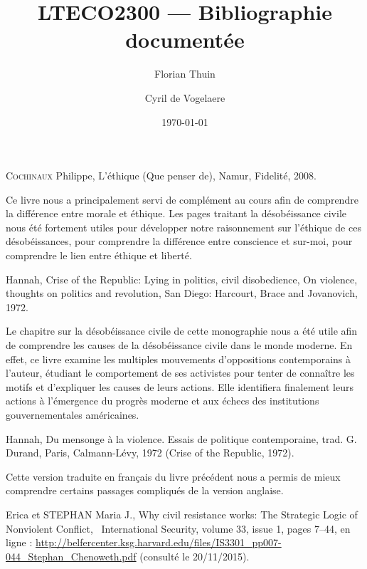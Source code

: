 \documentclass[a4paper, 11pt]{article}
\author{Florian Thuin \and Cyril de Vogelaere}
\date{\today}
\title{LTECO2300 --- Bibliographie documentée}
\begin{document}
    \maketitle
    \tableofcontents
    \textsc{Cochinaux} Philippe, L'éthique (Que penser de), Namur, Fidelité,
    2008.

    \begin{framed}
        Ce livre nous a principalement servi de complément au cours afin de
        comprendre la différence entre morale et éthique. Les pages traitant la
        désobéissance civile nous été fortement utiles pour développer notre
        raisonnement sur l’éthique de ces désobéissances, pour comprendre la
        différence entre conscience et sur-moi, pour comprendre le lien entre
        éthique et liberté.
    \end{framed}

     Hannah, Crise of the Republic: Lying in politics, civil
    disobedience, On violence, thoughts on politics and revolution, San Diego:
    Harcourt, Brace and Jovanovich, 1972.

    \begin{framed}
        Le chapitre sur la désobéissance civile de cette monographie nous a été
        utile afin de comprendre les causes de la désobéissance civile dans le
        monde moderne. En effet, ce livre examine les multiples mouvements
        d’oppositions contemporains à l’auteur, étudiant le comportement de ses
        activistes pour tenter de connaître les motifs et d’expliquer les
        causes de leurs actions. Elle identifiera finalement leurs actions à
        l’émergence du progrès moderne et aux échecs des institutions
        gouvernementales américaines.
    \end{framed}


     Hannah, Du mensonge à la violence. Essais de politique
    contemporaine, trad. G. Durand, Paris, Calmann-Lévy, 1972 (Crise of the
    Republic, 1972).

    \begin{framed}
        Cette version traduite en français du livre précédent nous a permis de
        mieux comprendre certains passages compliqués de la version anglaise.
    \end{framed}


     Erica et STEPHAN Maria J., Why civil resistance works: The
    Strategic Logic of Nonviolent Conflict,  International Security, volume 33,
    issue 1, pages 7--44, en ligne :
    \url{http://belfercenter.ksg.harvard.edu/files/IS3301_pp007-044_Stephan_Chenoweth.pdf}
    (consulté le 20/11/2015).
\end{document}
